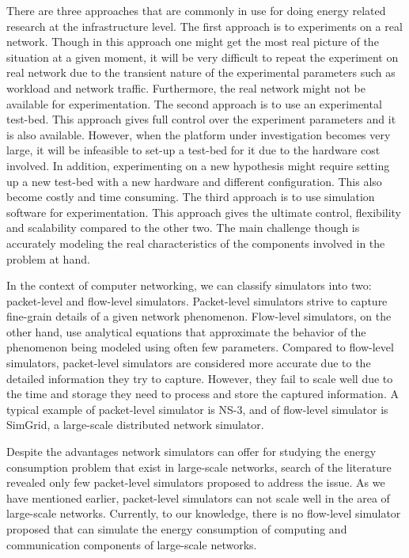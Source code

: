 There are three approaches that are commonly in use for doing energy related research at the infrastructure level. The first approach is to experiments on a real network. Though in this approach one might get the most real picture of the situation at a given moment, it will be very difficult to repeat the experiment on real network due to the transient nature of the experimental parameters such as workload and network traffic.  Furthermore, the real network might not be available for experimentation. The second approach is to use an experimental test-bed. This approach gives full control over the experiment parameters and it is also available. However, when the platform under investigation becomes very large, it will be infeasible to set-up a test-bed for it due to the hardware cost involved. In addition, experimenting on a new hypothesis might require setting up a new test-bed with a new hardware and different configuration. This also become costly and time consuming. The third approach is to use simulation software for experimentation. This approach gives the ultimate control, flexibility and scalability compared to the other two. The main challenge though is accurately modeling the real characteristics of the components involved in the problem at hand.

In the context of computer networking, we can classify simulators into two: packet-level and flow-level simulators. Packet-level simulators strive to capture fine-grain details of a given network phenomenon. Flow-level simulators, on the other hand, use analytical equations that approximate the behavior of the phenomenon being modeled using often few parameters. Compared to flow-level simulators, packet-level simulators are considered more accurate due to the detailed information they try to capture. However, they fail to scale well due to the time and storage they need to process and store the captured information. A typical example of packet-level simulator is NS-3, and of flow-level simulator is SimGrid, a large-scale distributed network simulator. 

Despite the advantages network simulators can offer for studying the energy consumption problem that exist in large-scale networks, search of the literature revealed only few packet-level simulators proposed to address the issue. As we have mentioned earlier, packet-level simulators can not scale well in the area of large-scale networks. Currently, to our knowledge, there is no flow-level simulator proposed that can simulate the energy consumption of computing and communication components of large-scale networks. 

